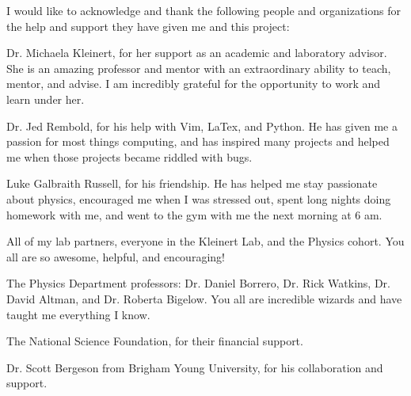 \documentclass[12pt]{report}
\begin{document}
\begin{acknowledgments}
I would like to acknowledge and thank the following people and organizations for the help and support they have given me and this project:

\begin{description}
   \item Dr. Michaela Kleinert, for her support as an academic and laboratory advisor. She is an amazing professor and mentor with an extraordinary ability to teach, mentor, and advise. I am incredibly grateful for the opportunity to work and learn under her.
   \item Dr. Jed Rembold, for his help with Vim, LaTex, and Python. He has given me a passion for most things computing, and has inspired many projects and helped me when those projects became riddled with bugs. 
   \item Luke Galbraith Russell, for his friendship. He has helped me stay passionate about physics, encouraged me when I was stressed out, spent long nights doing homework with me, and went to the gym with me the next morning at 6 am. 
   \item All of my lab partners, everyone in the Kleinert Lab, and the Physics cohort. You all are so awesome, helpful, and encouraging!
   \item The Physics Department professors: Dr. Daniel Borrero, Dr. Rick Watkins, Dr. David Altman, and Dr. Roberta Bigelow. You all are incredible wizards and have taught me everything I know.
   \item The National Science Foundation, for their financial support.
   \item Dr. Scott Bergeson from Brigham Young University, for his collaboration and support.
\end{description}


\end{acknowledgments}







\tableofcontents
\listoffigures

\pagebreak



\end{document}
